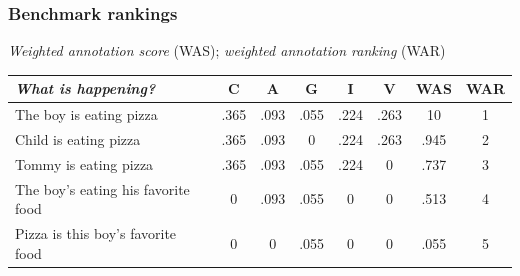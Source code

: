 \documentclass[xcolor={dvipsnames}]{beamer}
\begin{document}
\begin{frame}
\frametitle{Benchmark rankings}
\small


\vspace{.8em}
\textit{Weighted annotation score} (WAS); \textit{weighted annotation ranking} (WAR) \\
\begin{footnotesize}
\vspace{-.5em}
\begin{table}[htb!]
\begin{center}
\begin{tabular}{|p{2.7cm}||c|c|c|c|c|c|c|}
\hline
\textit{What is happening?} & C & A & G & I & V & WAS & WAR \\
\hline
\hline
The boy is eating pizza & .365 & .093 & .055 & .224 & .263 & 10 & 1 \\
\hline
Child is eating pizza & .365 & .093 & 0 & .224 & .263 & .945 & 2 \\
\hline
Tommy is eating pizza & .365 & .093 & .055 & .224 & 0 & .737 & 3 \\
\hline
The boy's eating his favorite food & 0 & .093 & .055 & 0 & 0 & .513 & 4 \\
\hline
Pizza is this boy's favorite food & 0 & 0 & .055 & 0 & 0 & .055 & 5 \\
\hline
\end{tabular}
\end{center}
\end{table}
\end{footnotesize}

\vspace{1em}


\end{frame}
\end{document}
